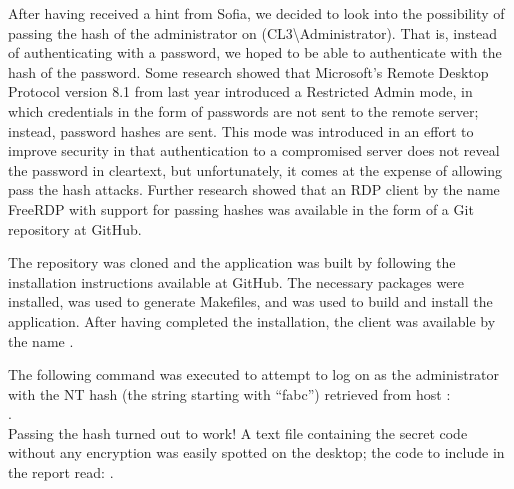 After having received a hint from Sofia, we decided to look into the possibility of passing the hash of the administrator on  (CL3\textbackslash Administrator). That is, instead of authenticating with a password, we hoped to be able to authenticate with the hash of the password. Some research showed that Microsoft's Remote Desktop Protocol version 8.1 from last year introduced a Restricted Admin mode, in which credentials in the form of passwords are not sent to the remote server; instead, password hashes are sent. This mode was introduced in an effort to improve security in that authentication to a compromised server does not reveal the password in cleartext, but unfortunately, it comes at the expense of allowing pass the hash attacks\cite{portcullis_blog}. Further research showed that an RDP client by the name FreeRDP with support for passing hashes was available in the form of a Git repository at GitHub\cite{portcullis_tools}\cite{freerdp_git_repo}.

The repository was cloned and the application was built by following the installation instructions available at GitHub\cite{freerdp_installation_instructions}. The necessary packages were installed,  was used to generate Makefiles, and  was used to build and install the application. After having completed the installation, the client was available by the name .

The following command was executed to attempt to log on as the administrator with the NT hash (the string starting with ``fabc'') retrieved from host :\\
.\\Passing the hash turned out to work! A text file containing the secret code without any encryption was easily spotted on the desktop; the code to include in the report read: .
